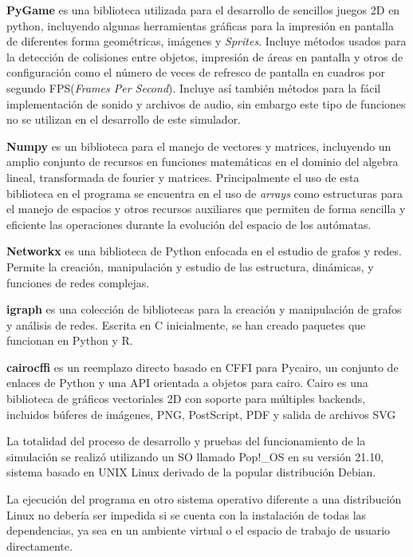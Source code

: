 \documentclass[]{article}
\begin{document}
			\hfill \break
			\justifying
			\textbf{PyGame} es una biblioteca utilizada para el desarrollo de sencillos juegos 2D en python, incluyendo algunas herramientas gráficas para la impresión en pantalla de diferentes forma geométricas, imágenes y \textit{Sprites}. Incluye métodos usados para la detección de colisiones entre objetos, impresión de áreas en pantalla y otros de configuración como el número de veces de refresco de pantalla en cuadros por segundo FPS(\textit{Frames Per Second}).
			Incluye así también métodos para la fácil implementación de sonido y archivos de audio, sin embargo este tipo de funciones no se utilizan en el desarrollo de este simulador.
			
			\hfill \break
			\justifying
			\textbf{Numpy} es un biblioteca para el manejo de vectores y matrices, incluyendo un amplio conjunto de recursos en funciones matemáticas en el dominio del algebra lineal, transformada de fourier y matrices.
			Principalmente el uso de esta biblioteca en el programa se encuentra en el uso de \textit{arrays} como estructuras para el manejo de espacios y otros recursos auxiliares que permiten de forma sencilla y eficiente las operaciones durante la evolución del espacio de los autómatas.
			
			\hfill \break
			\justifying
			\textbf{Networkx} es una biblioteca de Python enfocada en el estudio de grafos y redes. Permite la creación, manipulación y estudio de las estructura, dinámicas, y funciones de redes complejas.
			
			\hfill \break
			\justifying
			\textbf{igraph} es una colección de bibliotecas para la creación y manipulación de grafos y análisis de redes. Escrita en C inicialmente, se han creado paquetes que funcionan en Python y R.
			
			\hfill \break
			\justifying
			\textbf{cairocffi} es un reemplazo directo basado en CFFI para Pycairo, un conjunto de enlaces de Python y una API orientada a objetos para cairo. Cairo es una biblioteca de gráficos vectoriales 2D con soporte para múltiples backends, incluidos búferes de imágenes, PNG, PostScript, PDF y salida de archivos SVG
			
			\hfill \break
			\justifying
			La totalidad del proceso de desarrollo y pruebas del funcionamiento de la simulación se realizó utilizando un SO llamado Pop!\_OS en su versión 21.10, sistema basado en UNIX Linux derivado de la popular distribución Debian.
			
			\hfill \break
			\justifying
			La ejecución del programa en otro sistema operativo diferente a una distribución Linux no debería ser impedida si se cuenta con la instalación de todas las dependencias, ya sea en un ambiente virtual o el espacio de trabajo de usuario directamente.
			
\end{document}
